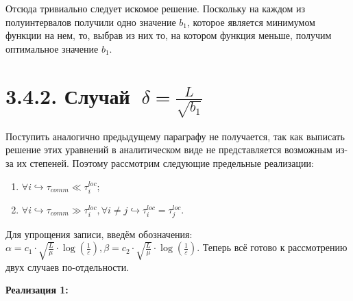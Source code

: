 \documentclass{article}
\theoremstyle{definition}
\theoremstyle{plain}
\begin{document}
Отсюда тривиально следует искомое решение. Поскольку на каждом из полуинтервалов получили одно значение $b_1$, которое является минимумом функции на нем, то, выбрав из них то, на котором функция меньше, получим оптимальное значение $b_1$.

\section*{3.4.2. Случай $~\delta = \frac{L}{\sqrt{b_1}}$}\label{eq:3.4.2}
Поступить аналогично предыдущему параграфу не получается, так как выписать решение этих уравнений в аналитическом виде не представляется возможным из-за их степеней.
Поэтому рассмотрим следующие предельные реализации:
\begin{enumerate}
    \item $\forall i\hookrightarrow \tau_{comm} \ll \tau_i^{loc};$
    \item $\forall i\hookrightarrow \tau_{comm} \gg \tau_i^{loc}, \forall i\neq j\hookrightarrow \tau_i^{loc} = \tau_j^{loc}.$
\end{enumerate}

Для упрощения записи, введём обозначения: $\alpha = c_1\cdot\sqrt{\frac{L}{\mu}}\cdot \log(\frac{1}{\varepsilon}),\beta = c_2\cdot\sqrt{\frac{L}{\mu}}\cdot \log(\frac{1}{\varepsilon}) $. Теперь всё готово к рассмотрению двух случаев по-отдельности.

\textbf{Реализация 1:}
\end{document}
